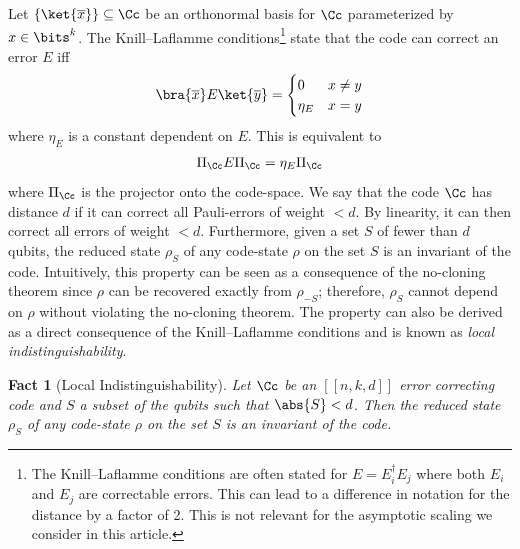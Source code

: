 \documentclass[11pt]{article}
\newtheorem{fact}[theorem]{Fact}
\begin{document}
Let $\{\ket{\overline{x}}\} \subseteq \Cc$ be an orthonormal basis for $\Cc$ parameterized by $x \in \bits^k$. The Knill--Laflamme conditions\footnote{The Knill--Laflamme conditions are often stated for $E = E_i^\dagger E_j$ where both $E_i$ and $E_j$ are correctable errors. This can lead to a difference in notation for the distance by a factor of 2. This is not relevant for the asymptotic scaling we consider in this %
article.}  %
state that the code can correct an error $E$ iff
\begin{align}
\bra{\overline x}E \ket{\overline y} = \begin{cases} 0 & x \neq y \\
\eta_E & x = y \end{cases}
\end{align}
where $\eta_E$ is a constant dependent on $E$. This is equivalent to
\begin{align}
\Pi_\Cc E \Pi_\Cc = \eta_E \Pi_\Cc \label{eq:kl-conditions}
\end{align}
where $\Pi_\Cc$ is the projector onto the code-space. We say that the code $\Cc$ has distance $d$ if it can correct all Pauli-errors of weight $<d$. By linearity, it can then correct all errors of weight $<d$. Furthermore, given a set $S$ of fewer than $d$ qubits, the reduced
%
state $\rho_S$ of any code-state $\rho$ on the set $S$ is an invariant of the code. Intuitively, this property can be seen as a consequence of the no-cloning theorem since $\rho$ can be recovered exactly from $\rho_{-S}$; therefore, $\rho_S$ cannot depend on $\rho$ without violating the no-cloning theorem. The property can also be derived as a direct consequence of the Knill--Laflamme conditions and is known as \emph{local indistinguishability}.

\begin{fact}[Local Indistinguishability]
\label{fact:local-indistinguishability}
Let $\Cc$ be %
an  %
$[[n,k,d]]$ error correcting code and $S$ a subset of the qubits such that $\abs{S} < d$. Then the reduced %
state $\rho_S$ of any code-state $\rho$ on the set $S$ is an invariant of the code.
\end{fact}
\end{document}
